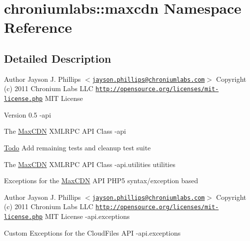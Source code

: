 \hypertarget{namespacechroniumlabs_1_1maxcdn}{
\section{chroniumlabs::maxcdn Namespace Reference}
\label{namespacechroniumlabs_1_1maxcdn}
}


\subsection{Detailed Description}
\begin{DoxyAuthor}{Author}
Jayson J. Phillips $<$\href{mailto:jayson.phillips@chroniumlabs.com}{\tt jayson.phillips@chroniumlabs.com}$>$  Copyright (c) 2011 Chronium Labs LLC  \href{http://opensource.org/licenses/mit-license.php}{\tt http://opensource.org/licenses/mit-\/license.php} MIT License 
\end{DoxyAuthor}
\begin{DoxyVersion}{Version}
0.5 -\/api
\end{DoxyVersion}
The \hyperlink{class_max_c_d_n}{MaxCDN} XMLRPC API Class -\/api \begin{Desc}
\item[\hyperlink{todo__todo000001}{Todo}]Add remaining tests and cleanup test suite \end{Desc}


The \hyperlink{class_max_c_d_n}{MaxCDN} XMLRPC API Class -\/api.utilities  utilities

Exceptions for the \hyperlink{class_max_c_d_n}{MaxCDN} API PHP5 syntax/exception based

\begin{DoxyAuthor}{Author}
Jayson J. Phillips $<$\href{mailto:jayson.phillips@chroniumlabs.com}{\tt jayson.phillips@chroniumlabs.com}$>$  Copyright (c) 2011 Chronium Labs LLC  \href{http://opensource.org/licenses/mit-license.php}{\tt http://opensource.org/licenses/mit-\/license.php} MIT License -\/api.exceptions
\end{DoxyAuthor}
Custom Exceptions for the CloudFiles API -\/api.exceptions 